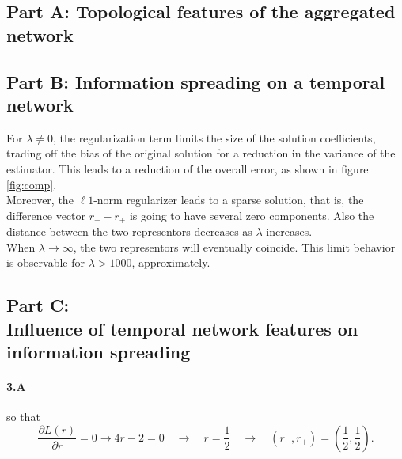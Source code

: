 
\subsection*{Part A: Topological features of the aggregated network}

	

\subsection*{Part B: Information spreading on a temporal network}

For $\lambda \neq 0$, the regularization term limits the size of the solution coefficients, trading off the bias of the original solution for a reduction in the variance of the estimator. 
This leads to a reduction of the overall error, as shown in figure \ref{fig:comp}.\\
Moreover, the $\ell1$-norm regularizer leads to a sparse solution, that is, the difference vector $r_- - r_+$ is going to have several zero components. Also the distance between the two representors decreases as $\lambda$ increases.\\
When $\lambda\rightarrow \infty$, the two representors will eventually coincide. This limit behavior is observable for $\lambda > 1000$, approximately.
\subsection*{Part C: \\Influence of temporal network features on information spreading}
\paragraph{3.A}	
so that
\begin{equation*}
\frac{\partial L(r)}{\partial r}=0 \rightarrow 4r-2 = 0 \quad \rightarrow \quad r = \frac{1}{2} \quad \rightarrow \quad (r_-, r_+) = \left(\frac{1}{2}, \frac{1}{2}\right).
\end{equation*}